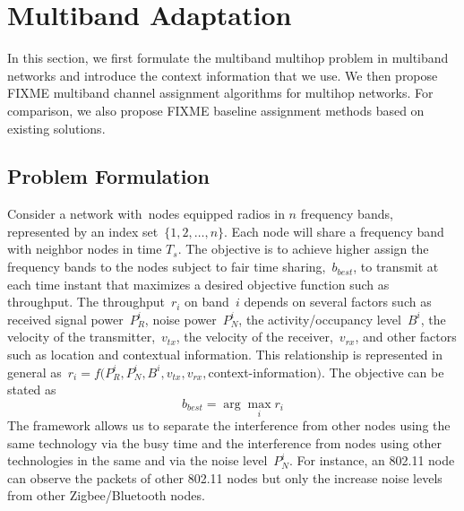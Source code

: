 \section{Multiband Adaptation}
\label{sec:model}

In this section, we first formulate the multiband 
multihop problem 
in multiband networks and introduce the context information 
that we use. We then propose {FIXME} multiband channel assignment algorithms for multihop networks. For comparison, we also propose {FIXME} baseline assignment methods based on existing solutions.

\subsection{Problem Formulation}
Consider a network with~nodes equipped radios in $n$ frequency bands, represented by an index set~$\{1,2, \ldots, n\}$. 
Each node will share a frequency band with neighbor nodes in time $T_s$.
The objective is to achieve higher assign the frequency bands to the nodes subject to fair time sharing,~$b_{best}$,
to transmit at each time instant that maximizes a desired objective function such as throughput. 
The throughput~$r_i$ on band~$i$ depends on several factors such as received signal power~$P_R^i$, noise power~$P_N^i$, the activity/occupancy level~$B^i$, the velocity of the transmitter,~$v_{tx}$, the velocity of the receiver,~$v_{rx}$, and other factors such as location and contextual information. This relationship is represented in general as~$r_i = f(P_R^i,P_N^i,B^i,v_{tx},v_{rx},$context-information$)$. The objective can be stated as
\begin{equation}
b_{best}= \arg \max_i r_i 
\end{equation}
The framework allows us to separate the interference from other nodes using the same technology via the busy time and the interference from nodes using other technologies in the same and via the noise level~$P_N^i$. For instance, an 802.11 node can observe the packets of other 802.11 nodes but only the increase noise levels from other Zigbee/Bluetooth nodes.
